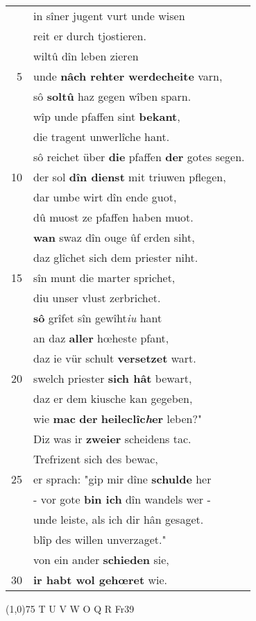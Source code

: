\documentclass[8pt,a4paper,notitlepage]{article}
\begin{document}
\begin{table}[ht]
\begin{minipage}[t]{0.5\linewidth}
\begin{tabular}{rl}
 & in sîner jugent vurt unde wisen\\ 
 & reit er durch tjostieren.\\ 
 & wiltû dîn leben zieren\\ 
5 & unde \textbf{nâch rehter werdecheite} varn,\\ 
 & sô \textbf{soltû} haz gegen wîben sparn.\\ 
 & wîp unde pfaffen sint \textbf{bekant},\\ 
 & die tragent unwerlîche hant.\\ 
 & sô reichet über \textbf{die} pfaffen \textbf{der} gotes segen.\\ 
10 & der sol \textbf{dîn dienst} mit triuwen pflegen,\\ 
 & dar umbe wirt dîn ende guot,\\ 
 & dû muost ze pfaffen haben muot.\\ 
 & \textbf{wan} swaz dîn ouge ûf erden siht,\\ 
 & daz glîchet sich dem priester niht.\\ 
15 & sîn munt die marter sprichet,\\ 
 & diu unser vlust zerbrichet.\\ 
 & \textbf{sô} grîfet sîn gewîht\textit{iu} hant\\ 
 & an daz \textbf{aller} hœheste pfant,\\ 
 & daz ie vür schult \textbf{versetzet} wart.\\ 
20 & swelch priester \textbf{sich hât} bewart,\\ 
 & daz er dem kiusche kan gegeben,\\ 
 & wie \textbf{mac} \textbf{der} \textbf{heileclîc\textit{h}er} leben?"\\ 
 & Diz was ir \textbf{zweier} scheidens tac.\\ 
 & Trefrizent sich des bewac,\\ 
25 & er sprach: "gip mir dîne \textbf{schulde} her\\ 
 & - vor gote \textbf{bin ich} dîn wandels wer -\\ 
 & unde leiste, als ich dir hân gesaget.\\ 
 & blîp des willen unverzaget."\\ 
 & von ein ander \textbf{schieden} sie,\\ 
30 & \textbf{ir habt wol gehœret} wie.\\ 
\end{tabular}
\scriptsize
\line(1,0){75} \newline
T U V W O Q R Fr39 \newline

\end{minipage}
\end{table}
\end{document}

